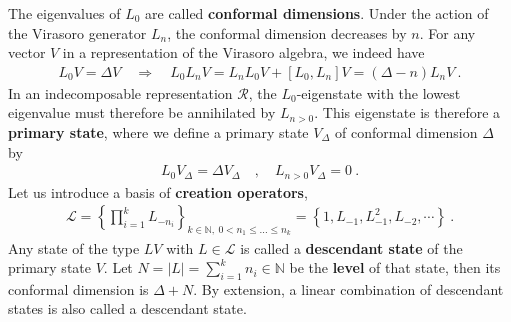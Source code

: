 \documentclass[12pt, a4paper]{article}
\newcommand{\myindex}[1]{\textbf{\boldmath #1}}
\theoremstyle{break}
\begin{document}
The eigenvalues of $L_0$ are called \myindex{conformal dimensions}. Under the action of the Virasoro generator $L_n$, the conformal dimension decreases by $n$. For any vector $V$ in a representation of the Virasoro algebra, we indeed have 
\begin{align}
 L_0V{} = \Delta V{} \quad \Rightarrow\quad  L_0 L_nV{} = L_nL_0V{} + [L_0, L_n] V{}  = (\Delta-n)L_nV{} \ .
\end{align}
In an indecomposable representation $\mathcal{R}$, the $L_0$-eigenstate with the lowest eigenvalue must therefore be annihilated by $L_{n>0}$. This eigenstate is therefore a \myindex{primary state}, where we define a primary state $V_\Delta$ of conformal dimension $\Delta$ by 
\begin{align}
  \boxed{L_0 V_\Delta = \Delta V_\Delta \quad , \quad L_{n>0} V_\Delta = 0}\ .
 \end{align}
Let us introduce a basis of \myindex{creation operators},
\begin{align}
 \mathcal{L} = \left\{\prod_{i=1}^k L_{-n_i} \right\}_{k\in\mathbb{N},\ 0<n_1\leq \dots \leq n_k}=\left\{1, L_{-1}, L_{-1}^2, L_{-2},\cdots \right\}\ .
 \label{lcm}
\end{align}
Any state of the type $L V{}$ with $L\in\mathcal{L}$ is called a \myindex{descendant state} of the primary state $V$. Let  $N=|L|=\sum_{i=1}^k n_i \in\mathbb{N}$ be the  \myindex{level} of that state, then its conformal dimension is $\Delta+N$. By extension, a linear combination of descendant states is also called a descendant state. 
\end{document}
